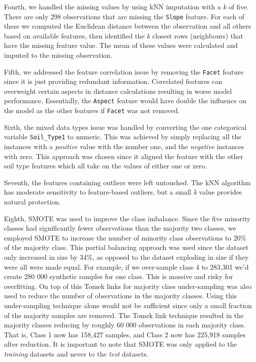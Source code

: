 \documentclass[conference]{IEEEtran}
\begin{document}
 Fourth, we handled the missing values by using kNN imputation with a \textit{k} of five. There are only 298 observations that are missing the \texttt{Slope} feature. For each of these we computed the Euclidean distance between the observation and all others based on available features, then identified the \textit{k} closest rows (neighbours) that have the missing feature value. The mean of these values were calculated and imputed to the missing observation.
 
 Fifth, we addressed the feature correlation issue by removing the \texttt{Facet} feature since it is just providing redundant information. Correlated features can overweight certain aspects in distance calculations resulting in worse model performance. Essentially, the \texttt{Aspect} feature would have double the influence on the model as the other features if \texttt{Facet} was not removed.
 
 Sixth, the mixed data types issue was handled by converting the one categorical variable \texttt{Soil\_Type1} to numeric. This was achieved by simply replacing all the instances with a \textit{positive} value with the number one, and the \textit{negative} instances with zero. This approach was chosen since it aligned the feature with the other soil type features which all take on the values of either one or zero.
 
 Seventh, the features containing outliers were left untouched. The kNN algorithm has moderate sensitivity to feature-based outliers, but a small \textit{k} value provides natural protection.
 
 Eighth, SMOTE was used to improve the class imbalance. Since the five minority classes had significantly fewer observations than the majority two classes, we employed SMOTE to increase the number of minority class observations to 20\% of the majority class. This partial balancing approach was used since the dataset only increased in size by 34\%, as opposed to the dataset exploding in size if they were all were made equal. For example, if we over-sample class 4 to 283,301 we'd create 280 000 synthetic samples for one class. This is massive and risky for overfitting. On top of this Tomek links for majority class under-sampling was also used to reduce the number of observations in the majority classes. Using this under-sampling technique alone would not be sufficient since only a small fraction of the majority samples are removed. The Tomek link technique resulted in the majority classes reducing by roughly 60 000 observations in each majority class. That is, Class 1 now has 158,427 samples, and Class 2 now has 225,918 samples after reduction.  It is important to note that SMOTE was only applied to the \textit{training} datasets and never to the \textit{test} datasets.
 
\end{document}
